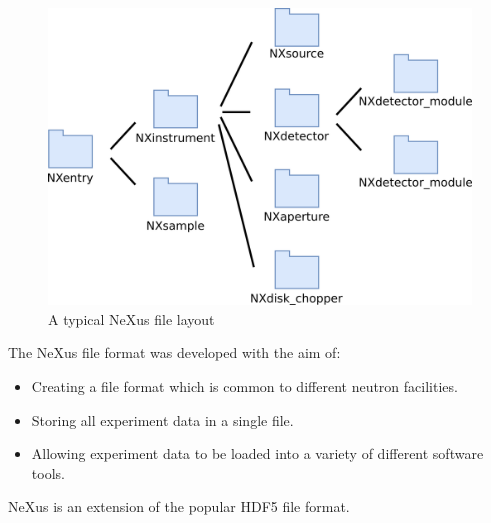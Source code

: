 \begin{figure}
\includegraphics[width=0.6\linewidth]{instrument_arch.png}
\caption{A typical NeXus file layout}
\end{figure}


The NeXus file format was developed with the aim of:
\begin{itemize}
\item Creating a file format which is common to different neutron facilities.
\item Storing all experiment data in a single file.
\item Allowing experiment data to be loaded into a variety of different software tools.
\end{itemize}

NeXus is an extension of the popular HDF5 file format.

